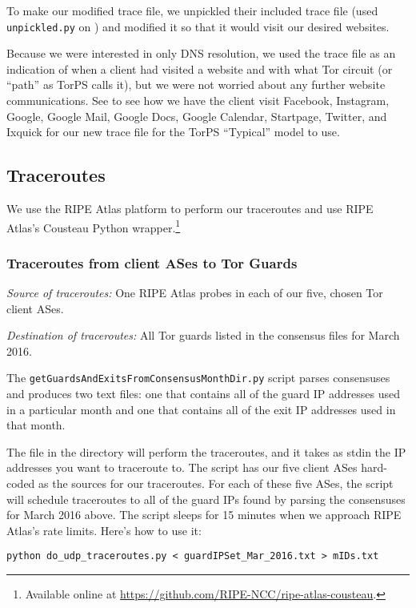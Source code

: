 \documentclass{article}
\begin{document}
To make our modified trace file, we unpickled their included trace file 
(used {\tt unpickled.py} on ) and 
modified it so that it would visit our desired websites.

Because we were interested in only DNS resolution, we used the trace file as an 
indication of when a client had visited a website and with what Tor circuit 
(or ``path'' as TorPS calls it), but we were not worried about any further 
website communications. 
See  to see how we have the 
client visit Facebook, Instagram, Google, Google Mail, Google Docs, 
Google Calendar, Startpage, Twitter, and Ixquick for our new trace 
file for the TorPS ``Typical'' model to use. 

\subsection{Traceroutes}
We use the RIPE Atlas platform to perform our traceroutes and use RIPE 
Atlas's Cousteau Python wrapper.\footnote{Available online at
\url{https://github.com/RIPE-NCC/ripe-atlas-cousteau}.}

\subsubsection{Traceroutes from client ASes to Tor Guards}
\emph{Source of traceroutes:} One RIPE Atlas probes in each of our five, chosen 
Tor client ASes.

\emph{Destination of traceroutes:} All Tor guards listed in the consensus 
files for March 2016.

The {\tt getGuardsAndExitsFromConsensusMonthDir.py} script parses consensuses 
and produces two text files: one that contains all of the guard IP addresses 
used in a particular month and one that contains all of the exit IP addresses 
used in that month.

The  file in the directory
will perform the traceroutes, and 
it takes as stdin the IP addresses you want to traceroute to. The script has 
our five client ASes hard-coded as the sources for our traceroutes. For each 
of these five ASes, the script will schedule traceroutes to all of the guard IPs 
found by parsing the consensuses for March 2016 above. The script sleeps for 
15 minutes when we approach RIPE Atlas's rate limits. Here's how to use it:
\begin{lstlisting}
python do_udp_traceroutes.py < guardIPSet_Mar_2016.txt > mIDs.txt
\end{lstlisting}
\end{document}
